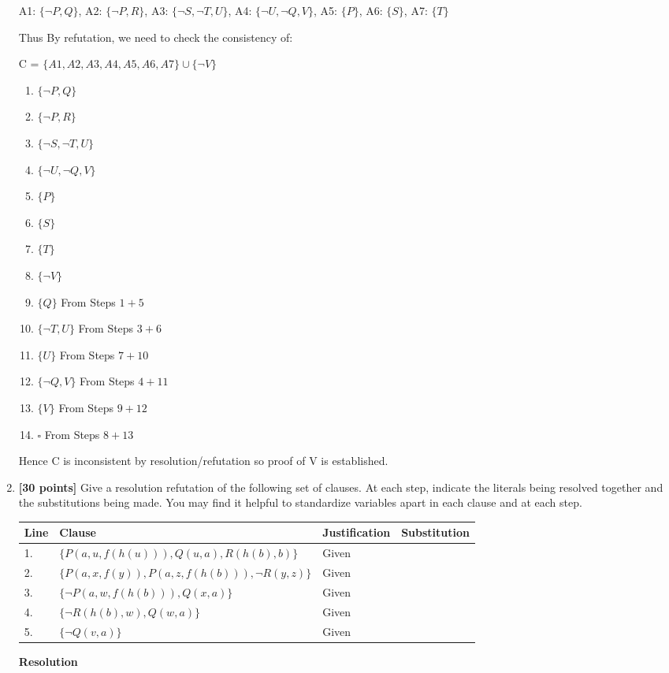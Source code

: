 \documentclass{article}
\begin{document}
\begin{enumerate}
\begin{answer}
   A1: $\{ \neg P, Q \}$, A2: $\{ \neg P, R \}$, A3: $\{ \neg S, \neg T, U \}$, A4: $\{ \neg U, \neg Q, V \}$, A5: $\{ P \}$, A6: $\{ S \}$, A7: $\{ T \}$
   
  Thus By refutation, we need to check the consistency of:
  
  C = $\{A1, A2, A3, A4, A5, A6, A7\} \cup \{\neg V\}$
  
		\begin{enumerate}
		  \item $\{ \neg P, Q \}$
		  \item $\{ \neg P, R \}$
		  \item $\{ \neg S, \neg T, U \}$
		  \item $\{ \neg U, \neg Q, V \}$
		  \item $\{ P \}$
		  \item $\{ S \}$ 
		  \item $\{ T \}$ 
		  \item $\{\neg V\}$ 
		  \item $\{Q\}$  From Steps $1 + 5$
		  \item $\{\neg T, U\}$ From Steps $3 + 6$
		  \item $\{U\}$ From Steps $7 + 10$
		  \item $\{\neg Q, V\}$ From Steps $4 + 11$
		  \item $\{V\}$ From Steps $9 + 12$
		  \item $\square$ From Steps $8 + 13$
		  
		 \end{enumerate}
		 
		 Hence C is inconsistent by resolution/refutation so proof of V is established.
  
  \end{answer}
  

\item \textbf{[30 points]} Give a resolution refutation of the
  following set of clauses.  At each step, indicate the literals being
  resolved together and the substitutions being made.  You may find it
  helpful to standardize variables apart in each clause and at each
  step.
  \begin{center}
    \begin{tabular}{llll}
      Line & Clause & Justification & Substitution \\ \hline
      1. & $\{ P(a,u,f(h(u))), Q(u,a), R(h(b),b) \}$ & Given & \\
      2. & $\{ P(a,x,f(y)), P(a,z,f(h(b))), \neg R(y,z) \}$ & Given & \\
      3. & $\{ \neg P(a,w,f(h(b))), Q(x,a) \}$ & Given & \\
      4. & $\{ \neg R(h(b),w), Q(w,a) \}$ & Given & \\
      5. & $\{ \neg Q(v,a) \}$ & Given & \\ \hline
    \end{tabular}
  \end{center}
	\begin{answer}
		\textbf{Resolution} 
		

\end{answer}
\end{enumerate}
\end{document}
